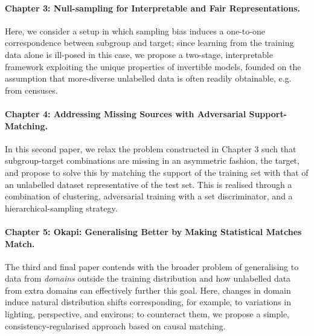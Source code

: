 \paragraph{Chapter 3: Null-sampling for Interpretable and Fair Representations.}
%
Here, we consider a setup in which sampling bias induces a one-to-one correspondence between
subgroup and target; since learning from the training data alone is ill-posed in this case, we
propose a two-stage, interpretable framework exploiting the unique properties of invertible models,
founded on the assumption that more-diverse unlabelled data is often readily obtainable, e.g. from
censuses.

\paragraph{Chapter 4: Addressing Missing Sources with Adversarial Support-Matching.}
%
In this second paper, we relax the problem constructed in Chapter 3 such that subgroup-target
combinations are missing in an asymmetric fashion, \wrt{} the target, and propose to solve this by
matching the support of the training set with that of an unlabelled dataset representative of the
test set. 
%
This is realised through a combination of clustering, adversarial training with a set
discriminator, and a hierarchical-sampling strategy.
%

\paragraph{Chapter 5: Okapi: Generalising Better by Making Statistical Matches Match.}
%
The third and final paper contends with the broader problem of generalising to data from
\emph{domains} outside the training distribution  and how unlabelled data from extra domains can
effectively further this goal.
%
Here, changes in domain induce natural distribution shifts corresponding, for example, to
variations in lighting, perspective, and environs; to counteract them, we propose a simple,
consistency-regularised approach based on causal matching.



    





%



